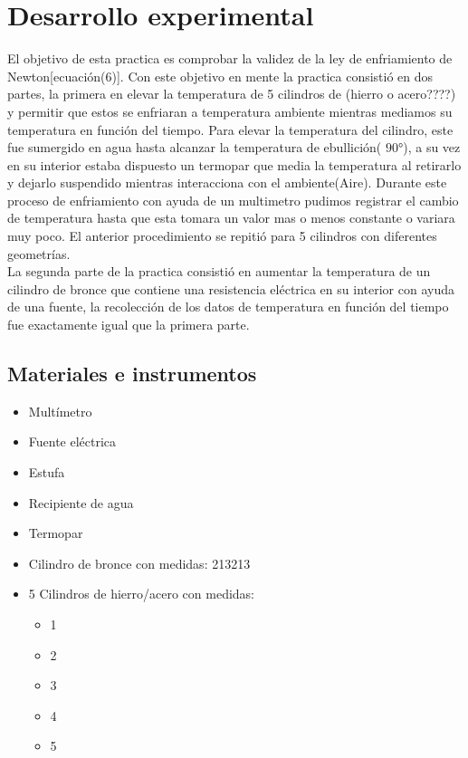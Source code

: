 \documentclass{article}
\begin{document}
\section{Desarrollo experimental}
El objetivo de esta practica es comprobar la validez de la ley de enfriamiento de Newton[ecuación(6)]. Con este objetivo en mente la practica consistió en dos partes, la primera en elevar la temperatura de 5 cilindros de (hierro o acero????)  y permitir que estos se enfriaran a temperatura ambiente mientras mediamos su temperatura en función del tiempo. 
Para elevar la temperatura del cilindro, este fue sumergido en agua hasta alcanzar la temperatura de ebullición( $90°$), a su vez en su interior estaba dispuesto un termopar que media la temperatura al retirarlo y dejarlo suspendido mientras interacciona con el ambiente(Aire). Durante este proceso de enfriamiento con ayuda de un multimetro pudimos registrar el cambio de temperatura hasta que esta tomara un valor mas o menos constante o variara muy poco. El anterior procedimiento se repitió para 5 cilindros con diferentes geometrías.  \\ 
La segunda parte de la practica consistió en aumentar la temperatura de un cilindro de bronce que contiene una resistencia eléctrica en su interior con ayuda de una fuente, la recolección de los datos de temperatura en función del tiempo fue exactamente igual que la primera parte.

\subsection{Materiales e instrumentos}
\begin{multicols}{2}
\begin{itemize}
    \item Multímetro
    \item Fuente eléctrica 
    \item Estufa
    \item Recipiente de agua
    \item Termopar
    \item Cilindro de bronce con medidas:
        213213
    \item 5 Cilindros de hierro/acero con medidas: 
        \begin{itemize}
        \item 1
        \item 2
        \item 3
        \item 4
        \item 5
        \end{itemize}
\end{itemize}
\end{multicols}
\end{document}
